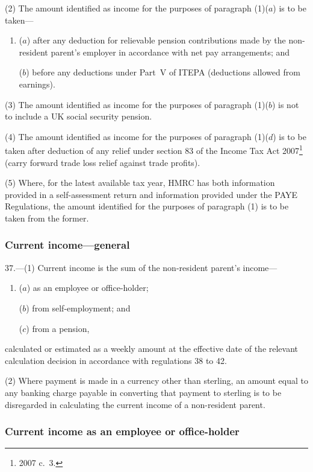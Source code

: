 \documentclass[12pt,a4paper]{article}
\begin{document}
(2) The amount identified as income for the purposes of paragraph (1)($a$)  is to be taken—
\begin{enumerate}\item[]
($a$) after any deduction for relievable pension contributions made by the non-resident parent’s employer in accordance with net pay arrangements; and

($b$) before any deductions under Part~V of ITEPA (deductions allowed from earnings).
\end{enumerate}

(3) The amount identified as income for the purposes of paragraph (1)($b$)  is not to include a UK social security pension.

(4) The amount identified as income for the purposes of paragraph (1)($d$)  is to be taken after deduction of any relief under section 83 of the Income Tax Act 2007\footnote{2007 c.~3.} (carry forward trade loss relief against trade profits).

(5) Where, for the latest available tax year, HMRC has both information provided in a self-assessment return and information provided under the PAYE Regulations, the amount identified for the purposes of paragraph (1) is to be taken from the former.

\subsubsection[37. Current income---general]{Current income---general}

37.---(1)  Current income is the sum of the non-resident parent’s income—
\begin{enumerate}\item[]
($a$) as an employee or office-holder;

($b$) from self-employment; and

($c$) from a pension,
\end{enumerate}
calculated or estimated as a weekly amount at the effective date of the relevant calculation decision in accordance with regulations 38 to 42.

(2) Where payment is made in a currency other than sterling, an amount equal to any banking charge payable in converting that payment to sterling is to be disregarded in calculating the current income of a non-resident parent.

\subsubsection[38. Current income as an employee or office-holder]{Current income as an employee or office-holder}
\end{document}
